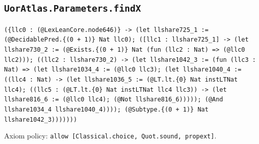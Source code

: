 \documentclass[11pt]{article}
\begin{document}
\subsection*{\texttt{UorAtlas.Parameters.findX}}
\noindent\texttt{(\{llc0 : (@LexLeanCore.node646)\} -> (let llshare725\_1 := (@DecidablePred.\{(0 + 1)\} Nat llc0); ([llc1 : llshare725\_1] -> (let llshare730\_2 := (@Exists.\{(0 + 1)\} Nat (fun (llc2 : Nat) => (@llc0 llc2))); ((llc2 : llshare730\_2) -> (let llshare1042\_3 := (fun (llc3 : Nat) => (let llshare1034\_4 := (@llc0 llc3); (let llshare1040\_4 := ((llc4 : Nat) -> (let llshare1036\_5 := (@LT.lt.\{0\} Nat instLTNat llc4); ((llc5 : (@LT.lt.\{0\} Nat instLTNat llc4 llc3)) -> (let llshare816\_6 := (@llc0 llc4); (@Not llshare816\_6))))); (@And llshare1034\_4 llshare1040\_4)))); (@Subtype.\{(0 + 1)\} Nat llshare1042\_3)))))))}\par
\noindent Axiom policy: \texttt{allow [Classical.choice, Quot.sound, propext]}.\par
\end{document}
